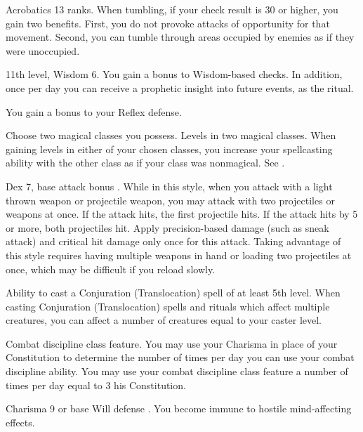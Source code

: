 \featpre Acrobatics 13 ranks.
\featben When tumbling, if your check result is 30 or higher, you gain two benefits. First, you do not provoke attacks of opportunity for that movement. Second, you can tumble through areas occupied by enemies as if they were unoccupied.

\featpre 11th level, Wisdom 6.
\featben You gain a  bonus to Wisdom-based checks. In addition, once per day you can receive a prophetic insight into future events, as the  ritual.

 You gain a  bonus to your Reflex defense.

Choose two magical classes you possess.
 Levels in two magical classes.
 When gaining levels in either of your chosen classes, you increase your spellcasting ability with the other class as if your class was nonmagical. See .

 Dex 7, base attack bonus .
 While in this style, when you attack with a light thrown weapon or projectile weapon, you may attack with two projectiles or weapons at once. If the attack hits, the first projectile hits. If the attack hits by 5 or more, both projectiles hit. Apply precision-based damage (such as sneak attack) and critical hit damage only once for this attack. Taking advantage of this style requires having multiple weapons in hand or loading two projectiles at once, which may be difficult if you reload slowly.

\featpre Ability to cast a Conjuration (Translocation) spell of at least 5th level.
\featben When casting Conjuration (Translocation) spells and rituals which affect multiple creatures, you can affect a number of creatures equal to your caster level.

\featpre Combat discipline class feature.
\featben You may use your Charisma in place of your Constitution to determine the number of times per day you can use your combat discipline ability.
 You may use your combat discipline class feature a number of times per day equal to 3 \add his Constitution.

\featpre Charisma 9 or base Will defense .
\featben You become immune to hostile mind-affecting effects.

